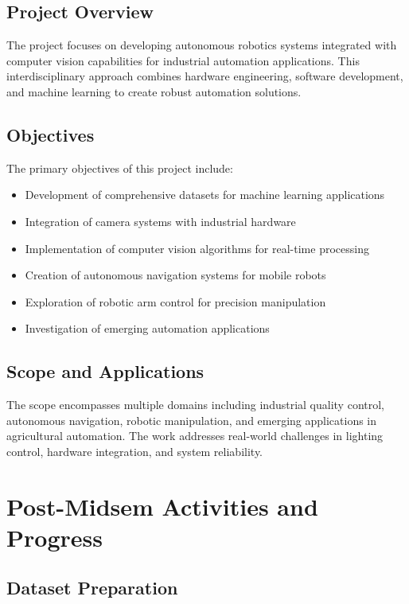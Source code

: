 \documentclass[12pt]{article}
\begin{document}
\subsection{Project Overview}
The project focuses on developing autonomous robotics systems integrated with computer vision capabilities for industrial automation applications. This interdisciplinary approach combines hardware engineering, software development, and machine learning to create robust automation solutions.

\subsection{Objectives}
The primary objectives of this project include:
\begin{itemize}
\item Development of comprehensive datasets for machine learning applications
\item Integration of camera systems with industrial hardware
\item Implementation of computer vision algorithms for real-time processing
\item Creation of autonomous navigation systems for mobile robots
\item Exploration of robotic arm control for precision manipulation
\item Investigation of emerging automation applications
\end{itemize}

\subsection{Scope and Applications}
The scope encompasses multiple domains including industrial quality control, autonomous navigation, robotic manipulation, and emerging applications in agricultural automation. The work addresses real-world challenges in lighting control, hardware integration, and system reliability.

\newpage

\section{Post-Midsem Activities and Progress}

\subsection{Dataset Preparation}
\end{document}

